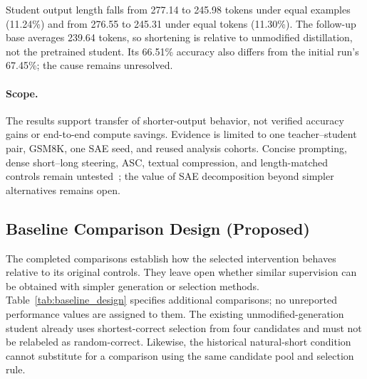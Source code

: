 Student output length falls from 277.14 to 245.98 tokens under equal examples (11.24\%) and from 276.55 to 245.31 under equal tokens (11.30\%).
The follow-up base averages 239.64 tokens, so shortening is relative to unmodified distillation, not the pretrained student.
Its 66.51\% accuracy also differs from the initial run's 67.45\%; the cause remains unresolved.

\paragraph{Scope.}
\label{sec:experiment_scope}
The results support transfer of shorter-output behavior, not verified accuracy gains or end-to-end compute savings.
Evidence is limited to one teacher--student pair, GSM8K, one SAE seed, and reused analysis cohorts.
Concise prompting, dense short--long steering, ASC, textual compression, and length-matched controls remain untested~\citep{azizi2026activation,wu2025concise}; the value of SAE decomposition beyond simpler alternatives remains open.

\subsection{Baseline Comparison Design (Proposed)}
\label{sec:baseline_design}

The completed comparisons establish how the selected intervention behaves relative to its original controls.
They leave open whether similar supervision can be obtained with simpler generation or selection methods.
Table~\ref{tab:baseline_design} specifies additional comparisons; no unreported performance values are assigned to them.
The existing unmodified-generation student already uses shortest-correct selection from four candidates and must not be relabeled as random-correct.
Likewise, the historical natural-short condition cannot substitute for a comparison using the same candidate pool and selection rule.

